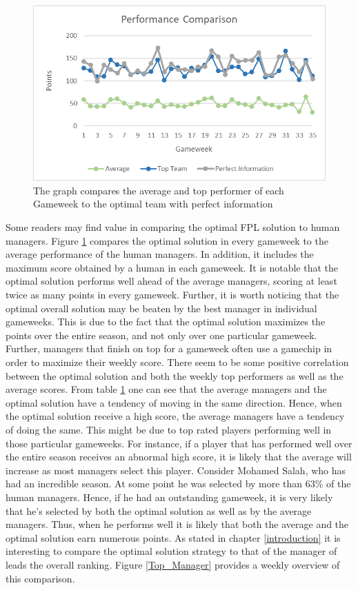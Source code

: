 \begin{figure}[H]
\label{fig:Comparison}
    \centering
    \includegraphics[scale=1.00]{fig/chapter_7/Comparison.png}
    \caption{The graph compares the average and top performer of each Gameweek to the optimal team with perfect information}
\label{Figure_Comparison}    
\end{figure}

Some readers may find value in comparing the optimal FPL solution to human managers. Figure \ref{Figure_Comparison} compares the optimal solution in every gameweek to the average performance of the human managers. In addition, it includes the maximum score obtained by a human in each gameweek. It is notable that the optimal solution performs well ahead of the average managers, scoring at least twice as many points in every gameweek. Further, it is worth noticing that the optimal overall solution may be beaten by the best manager in individual gameweeks. This is due to the fact that the optimal solution maximizes the points over the entire season, and not only over one particular gameweek. Further, managers that finish on top for a gameweek often use a gamechip in order to maximize their weekly score. 
\newpar
There seem to be some positive correlation between the optimal solution and both the weekly top performers as well as the average scores. From table \ref{Figure_Comparison} one can see that the average managers and the optimal solution have a tendency of moving in the same direction. Hence, when the optimal solution receive a high score, the average managers have a tendency of doing the same. This might be due to top rated players performing well in those particular gameweeks. For instance, if a player that has performed well over the entire season receives an abnormal high score, it is likely that the average will increase as most managers select this player. Consider Mohamed Salah, who has had an incredible season. At some point he was selected by more than 63\% of the human managers. Hence, if he had an outstanding gameweek, it is very likely that he's selected by both the optimal solution as well as by the average managers. Thus, when he performs well it is likely that both the average and the optimal solution earn numerous points. 
\newpar
As stated in chapter \ref{introduction} it is interesting to compare the optimal solution strategy to that of the manager of leads the overall ranking. Figure \ref{Top_Manager} provides a weekly overview of this comparison.

